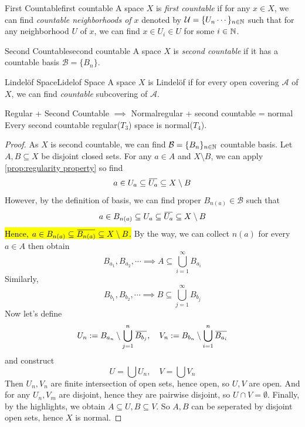 \documentclass[12pt, a4paper, twoside]{article}
\newcommand{\overbar}[1]{\mkern 1.5mu\overline{\mkern-1.5mu#1\mkern-1.5mu}\mkern 1.5mu}
\newcommand{\CA}{{\mathcal {A}}} \newcommand{\CB}{{\mathcal {B}}}
\newcommand{\CU}{{\mathcal {U}}} \newcommand{\CV}{{\mathcal {V}}}
\theoremstyle{plain}
\begin{document}
\begin{defn}{First Countable}{first countable}
    A space $X$ is \textit{first countable} if for any $x \in X$, we can find 
    \textit{countable neighborhoods of $x$} denoted by $\CU = \{U_n\cdots \}_{n \in \BN}$ 
    such that for any neighborhood $U$ of $x$, we can find $x \in U_i \in U$ for some $i \in {\mathbb {N}}$. 
\end{defn}

\begin{defn}{Second Countable}{second countable}
    A space $X$ is \textit{second countable} if it has a countable basis $\CB = \{B_n\}$. 
\end{defn}

\begin{defn}{Lindel\"of Space}{Lidelof Space}
    A space $X$ is Lindel\"of if for every open covering $\CA$ of $X$, 
    we can find \textit{countable} subcovering of $\CA$. 
\end{defn}

\begin{thm}{Regular + Second Countable $\implies$ Normal}{regular + second countable = normal}
    Every second countable regular($T_3$) space is normal($T_4$). 
\end{thm}

\begin{proof}
    As $X$ is second countable, we can find $\CB = \{B_n\}_{n \in \BN}$ countable basis. 
    Let $A, B \subseteq X$ be disjoint closed sets. 
    For any $a \in A$ and $X \setminus B$, we can apply \ref{prop:regularity property} so find 
    \[a \in U_a \subseteq \overbar{U_a} \subseteq X \setminus B\]
    However, by the definition of basis, we can find proper $B_{n(a)} \in \CB$ such that 
    \[a \in B_{n(a)} \subseteq U_a \subseteq \overbar{U_a} \subseteq X \setminus B\]
    \hl{Hence, $a \in B_{n(a)} \subseteq \overbar{B_{n(a)}} \subseteq X \setminus B$. }
    By the way, we can collect $n(a)$ for every $a \in A$ then obtain 
    \[B_{a_1}, B_{a_2}, \cdots \implies A \subseteq \bigcup_{i = 1}^{\infty} B_{a_i}\]
    Similarly, 
    \[B_{b_1}, B_{b_2}, \cdots \implies B \subseteq \bigcup_{j = 1}^{\infty} B_{b_j}\]
    Now let's define 
    \[U_n := B_{a_n} \setminus \bigcup_{j = 1}^{n} \overbar{B_{b_j}}, \quad V_n := B_{b_n} \setminus \bigcup_{i = 1}^{n} \overbar{B_{a_i}}\]
    and construct 
    \[U = \bigcup U_n, \quad V = \bigcup V_n\]
    Then $U_n, V_n$ are finite intersection of open sets, hence open, so $U, V$ are open. 
    And for any $U_n, V_m$ are disjoint, hence they are pairwise disjoint, so $U \cap V = \emptyset$. 
    Finally, by the highlights, we obtain $A \subseteq U, B \subseteq V$. So $A, B$ can be seperated by disjoint open sets, hence $X$ is normal.
\end{proof}
\end{document}
